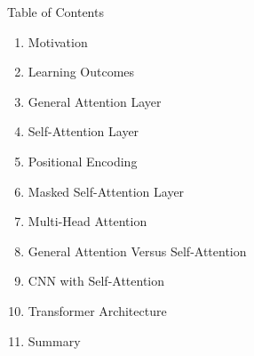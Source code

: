 \begin{frame}[allowframebreaks]{Table of Contents}
\begin{enumerate}
    \item Motivation
    \item Learning Outcomes
    \item General Attention Layer
    \item Self-Attention Layer
    \item Positional Encoding
    \item Masked Self-Attention Layer
    \item Multi-Head Attention
    \item General Attention Versus Self-Attention
    \item CNN with Self-Attention
    \item Transformer Architecture
    \item Summary
\end{enumerate}
\end{frame}